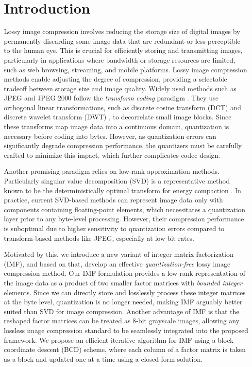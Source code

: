 \section{Introduction} \label{sec: introduction}

Lossy image compression involves reducing the storage size of digital images by permanently discarding some image data that are redundant or less perceptible to the human eye. This is crucial for efficiently storing and transmitting images, particularly in applications where bandwidth or storage resources are limited, such as web browsing, streaming, and mobile platforms. Lossy image compression methods enable adjusting the degree of compression, providing a selectable tradeoff between storage size and image quality. Widely used methods such as JPEG \cite{wallace1991jpeg} and JPEG 2000 \cite{skodras2001jpeg} follow the \emph{transform coding} paradigm \cite{goyal2001theoretical}. They use orthogonal linear transformations, such as discrete cosine transform (DCT) \cite{ahmed1974discrete} and discrete wavelet transform (DWT) \cite{antonini1992image}, to decorrelate small image blocks. Since these transforms map image data into a continuous domain, quantization is necessary before coding into bytes. However, as quantization errors can significantly degrade compression performance, the quantizers must be carefully crafted to minimize this impact, which further complicates codec design.

Another promising paradigm relies on low-rank approximation methods. Particularly singular value decomposition (SVD) is a representative method known to be the deterministically optimal transform for energy compaction \cite{andrews1976singular}. In practice, current SVD-based methods \cite{andrews1976singular, prasantha2007image, hou2015sparse} can represent image data only with components containing floating-point elements, which necessitates a quantization layer prior to any byte-level processing. However, their compression performance is suboptimal due to higher sensitivity to quantization errors compared to transform-based methods like JPEG, especially at low bit rates.

Motivated by this, we introduce a new variant of integer matrix factorization (IMF), and based on that, develop an effective \emph{quantization-free} lossy image compression method. Our IMF formulation provides a low-rank representation of the image data as a product of two smaller factor matrices with \emph{bounded integer} elements. Since we can directly store and losslessly process these integer matrices at the byte level, quantization is no longer needed, making IMF arguably better suited than SVD for image compression. Another advantage of IMF is that the reshaped factor matrices can be treated as 8-bit grayscale images, allowing any lossless image compression standard to be seamlessly integrated into the proposed framework. We propose an efficient iterative algorithm for IMF using a block coordinate descent (BCD) scheme, where each column of a factor matrix is taken as a block and updated one at a time using a closed-form solution.
 
